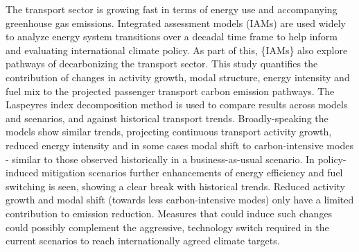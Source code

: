 The transport sector is growing fast in terms of energy use and accompanying greenhouse gas emissions. Integrated assessment models (IAMs) are used widely to analyze energy system transitions over a decadal time frame to help inform and evaluating international climate policy. As part of this, \{IAMs\} also explore pathways of decarbonizing the transport sector. This study quantifies the contribution of changes in activity growth, modal structure, energy intensity and fuel mix to the projected passenger transport carbon emission pathways. The Laspeyres index decomposition method is used to compare results across models and scenarios, and against historical transport trends. Broadly-speaking the models show similar trends, projecting continuous transport activity growth, reduced energy intensity and in some cases modal shift to carbon-intensive modes - similar to those observed historically in a business-as-usual scenario. In policy-induced mitigation scenarios further enhancements of energy efficiency and fuel switching is seen, showing a clear break with historical trends. Reduced activity growth and modal shift (towards less carbon-intensive modes) only have a limited contribution to emission reduction. Measures that could induce such changes could possibly complement the aggressive, technology switch required in the current scenarios to reach internationally agreed climate targets.